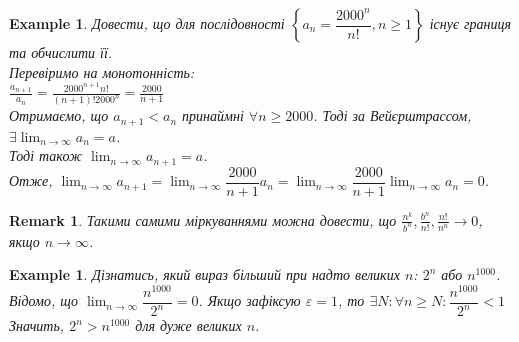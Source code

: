 \documentclass[a4paper, 14pt]{article}
\def\huge{\displaystyle}
\theoremstyle{theoremdd}
\theoremstyle{theoremdd}
\theoremstyle{theoremdd}
\theoremstyle{theoremdd}
\newtheorem{example}[theorem]{Example}
\theoremstyle{theoremdd}
\theoremstyle{theoremdd}
\newtheorem{remark}[theorem]{Remark}
\theoremstyle{theoremdd}
\theoremstyle{theoremdd}
\begin{document}
	\begin{example}
	Довести, що для послідовності $\left\{ a_n = \dfrac{2000^n}{n!}, n \geq 1 \right\}$ існує границя та обчислити її.\\
	Перевіримо на монотонність:\\
	$\displaystyle \frac{a_{n+1}}{a_n} = \frac{2000^{n+1} n!}{(n+1)! 2000^n} = \frac{2000}{n+1}$\\
	Отримаємо, що $a_{n+1} < a_n$ принаймні $\forall n \geq 2000$. Тоді за Вейєрштрассом, $\exists \huge \lim_{n \to \infty} a_n = a$.\\
	Тоді також $\huge \lim_{n \to \infty} a_{n+1} = a$.\\
	Отже, $\huge \lim_{n \to \infty} a_{n+1} = \lim_{n \to \infty} \dfrac{2000}{n+1} a_n = \lim_{n \to \infty} \dfrac{2000}{n+1} \lim_{n \to \infty} a_n = 0$.
	\end{example}
	
	\begin{remark}
	Такими самими міркуваннями можна довести, що $\displaystyle \frac{n^k}{b^n}, \frac{b^n}{n!}, \frac{n!}{n^n} \to 0$, якщо $n \to \infty$.
	\end{remark}
	
	\begin{example}
	Дізнатись, який вираз більший при надто великих $n$: \hspace{0.2cm}
	$2^n$ або $n^{1000}$.\\
	Відомо, що $\huge \lim_{n \to \infty} \dfrac{n^{1000}}{2^n} = 0$. Якщо зафіксую $\varepsilon = 1$, то $\exists N: \forall n \geq N: \dfrac{n^{1000}}{2^n} < 1$\\
	Значить, $2^n > n^{1000}$ для дуже великих $n$.
	\end{example}
	
\end{document}
